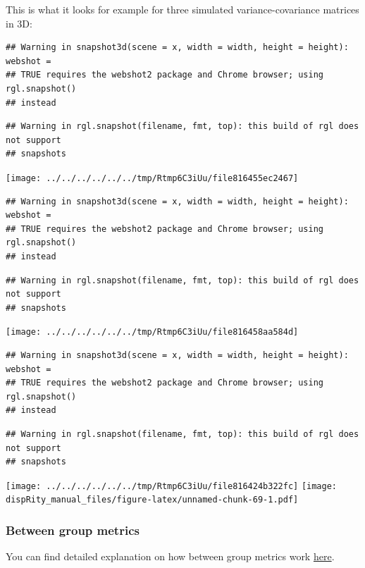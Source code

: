 \documentclass[
]{book}
\begin{document}
This is what it looks for example for three simulated variance-covariance matrices in 3D:

\begin{verbatim}
## Warning in snapshot3d(scene = x, width = width, height = height): webshot =
## TRUE requires the webshot2 package and Chrome browser; using rgl.snapshot()
## instead
\end{verbatim}

\begin{verbatim}
## Warning in rgl.snapshot(filename, fmt, top): this build of rgl does not support
## snapshots
\end{verbatim}

\texttt{[image: ../../../../../../tmp/Rtmp6C3iUu/file816455ec2467]}

\begin{verbatim}
## Warning in snapshot3d(scene = x, width = width, height = height): webshot =
## TRUE requires the webshot2 package and Chrome browser; using rgl.snapshot()
## instead
\end{verbatim}

\begin{verbatim}
## Warning in rgl.snapshot(filename, fmt, top): this build of rgl does not support
## snapshots
\end{verbatim}

\texttt{[image: ../../../../../../tmp/Rtmp6C3iUu/file816458aa584d]}

\begin{verbatim}
## Warning in snapshot3d(scene = x, width = width, height = height): webshot =
## TRUE requires the webshot2 package and Chrome browser; using rgl.snapshot()
## instead
\end{verbatim}

\begin{verbatim}
## Warning in rgl.snapshot(filename, fmt, top): this build of rgl does not support
## snapshots
\end{verbatim}

\texttt{[image: ../../../../../../tmp/Rtmp6C3iUu/file816424b322fc]}
\texttt{[image: dispRity\_manual\_files/figure-latex/unnamed-chunk-69-1.pdf]}

\hypertarget{betweengroupmetricslist}{%
\subsubsection{Between group metrics}\label{betweengroupmetricslist}}

You can find detailed explanation on how between group metrics work \protect\hyperlink{betweengroupmetricsexplain}{here}.
\end{document}
